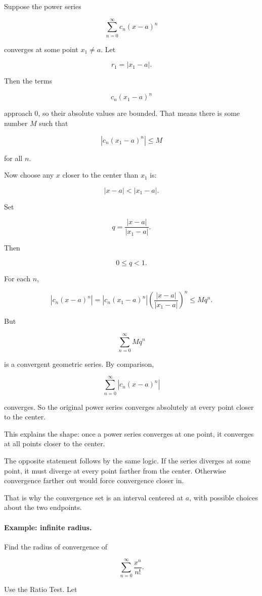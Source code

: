 Suppose the power series

\[
\sum_{n=0}^{\infty} c_n(x-a)^n
\]

converges at some point \(x_1\neq a\).  Let

\[
r_1=|x_1-a|.
\]

Then the terms

\[
c_n(x_1-a)^n
\]

approach \(0\), so their absolute values are bounded.  That means there is some
number \(M\) such that

\[
|c_n(x_1-a)^n|\le M
\]

for all \(n\).

Now choose any \(x\) closer to the center than \(x_1\) is:

\[
|x-a|<|x_1-a|.
\]

Set

\[
q=\frac{|x-a|}{|x_1-a|}.
\]

Then

\[
0\le q<1.
\]

For each \(n\),

\[
|c_n(x-a)^n|
=
|c_n(x_1-a)^n|
\left(\frac{|x-a|}{|x_1-a|}\right)^n
\le
Mq^n.
\]

But

\[
\sum_{n=0}^{\infty} Mq^n
\]

is a convergent geometric series.  By comparison,

\[
\sum_{n=0}^{\infty} |c_n(x-a)^n|
\]

converges.  So the original power series converges absolutely at every point closer
to the center.

This explains the shape: once a power series converges at one point, it converges at
all points closer to the center.

The opposite statement follows by the same logic.  If the series diverges at some
point, it must diverge at every point farther from the center.  Otherwise convergence
farther out would force convergence closer in.

That is why the convergence set is an interval centered at \(a\), with possible choices
about the two endpoints.

\paragraph{Example: infinite radius.}
Find the radius of convergence of

\[
\sum_{n=0}^{\infty}\frac{x^n}{n!}.
\]

Use the Ratio Test.  Let


